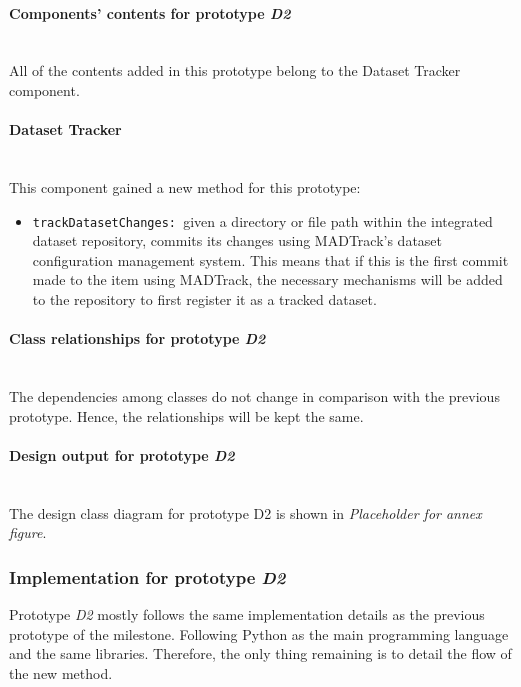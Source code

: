 \paragraph{Components' contents for prototype \emph{D2}} \mbox{}\\

All of the contents added in this prototype belong to the Dataset Tracker component.

\paragraph{Dataset Tracker} \mbox{}\\

This component gained a new method for this prototype:

\begin{itemize}
    \item \texttt{trackDatasetChanges: }given a directory or file path within the integrated dataset repository, commits its changes using MADTrack's dataset 
    configuration management system. This means that if this is the first commit made to the item using MADTrack, the necessary mechanisms will be added to the 
    repository to first register it as a tracked dataset.
\end{itemize}

\paragraph{Class relationships for prototype \emph{D2}} \mbox{}\\

The dependencies among classes do not change in comparison with the previous prototype. Hence, the relationships will be kept the same.

\paragraph{Design output for prototype \emph{D2}}\mbox{}\\

The design class diagram for prototype D2 is shown in \emph{Placeholder for annex figure}.

\subsubsection{Implementation for prototype \emph{D2}}

Prototype \emph{D2} mostly follows the same implementation details as the previous prototype of the milestone. Following Python as the main programming language and the same
libraries. Therefore, the only thing remaining is to detail the flow of the new method.

